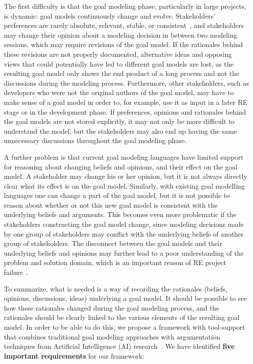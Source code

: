 
The first difficulty is that the goal modeling phase, particularly in large projects, is dynamic: goal models continuously change and evolve. Stakeholders' preferences are rarely absolute, relevant, stable, or consistent~\cite{march1978bounded}, and stakeholders may change their opinion about a modeling decision in between two modeling sessions, which may require revisions of the goal model. If the rationales behind these revisions are not properly documented, alternative ideas and opposing views that could potentially have led to different goal models are lost, as the resulting goal model only shows the end product of a long process and not the discussions during the modeling process. Furthermore, other stakeholders, such as developers who were not the original authors of the goal model, may have to make sense of a goal model in order to, for example, use it as input in a later RE stage or in the development phase. If preferences, opinions and rationales behind the goal models are not stored explicitly, it may not only be more difficult to understand the model, but the stakeholders may also end up having the same unnecessary discussions throughout the goal modeling phase.

A further problem is that current goal modeling languages have limited support for reasoning about changing beliefs and opinions, and their effect on the goal model. A stakeholder may change his or her opinion, but it is not always directly clear what its effect is on the goal model. Similarly, with existing goal modelling languages one can change a part of the goal model, but it is not possible to reason about whether or not this new goal model is consistent with the underlying beliefs and arguments. This becomes even more problematic if the stakeholders constructing the goal model change, since modeling decisions made by one group of stakeholders may conflict with the underlying beliefs of another group of stakeholders. The disconnect between the goal models and their underlying beliefs and opinions may further lead to a poor understanding of the problem and solution domain, which is an important reason of RE project failure~\cite{curtis1988field}. 

To summarize, what is needed is a way of recording the rationales (beliefs, opinions, discussions, ideas) underlying a goal model. It should be possible to see how these rationales changed during the goal modeling process, and the rationales should be clearly linked to the various elements of the resulting goal model. In order to be able to do this, we propose a framework with tool-support that combines traditional goal modeling approaches with argumentation techniques from Artificial Intelligence (AI) research~\cite{BenchCaponDunne2007}. We have identified \textbf{five important requirements} for our framework: 

